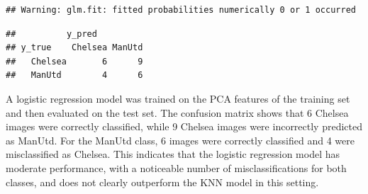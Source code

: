 \documentclass[
]{article}
\newenvironment{Shaded}{\begin{snugshade}}{\end{snugshade}}
\newcommand{\AttributeTok}[1]{\textcolor[rgb]{0.13,0.29,0.53}{#1}}
\newcommand{\FloatTok}[1]{\textcolor[rgb]{0.00,0.00,0.81}{#1}}
\newcommand{\FunctionTok}[1]{\textcolor[rgb]{0.13,0.29,0.53}{\textbf{#1}}}
\newcommand{\NormalTok}[1]{#1}
\newcommand{\OtherTok}[1]{\textcolor[rgb]{0.56,0.35,0.01}{#1}}
\newcommand{\SpecialCharTok}[1]{\textcolor[rgb]{0.81,0.36,0.00}{\textbf{#1}}}
\newcommand{\StringTok}[1]{\textcolor[rgb]{0.31,0.60,0.02}{#1}}
\begin{document}
\begin{verbatim}
## Warning: glm.fit: fitted probabilities numerically 0 or 1 occurred
\end{verbatim}

\begin{Shaded}
\end{Shaded}

\begin{verbatim}
##          y_pred
## y_true    Chelsea ManUtd
##   Chelsea       6      9
##   ManUtd        4      6
\end{verbatim}

A logistic regression model was trained on the PCA features of the
training set and then evaluated on the test set. The confusion matrix
shows that 6 Chelsea images were correctly classified, while 9 Chelsea
images were incorrectly predicted as ManUtd. For the ManUtd class, 6
images were correctly classified and 4 were misclassified as Chelsea.
This indicates that the logistic regression model has moderate
performance, with a noticeable number of misclassifications for both
classes, and does not clearly outperform the KNN model in this setting.
\end{document}
